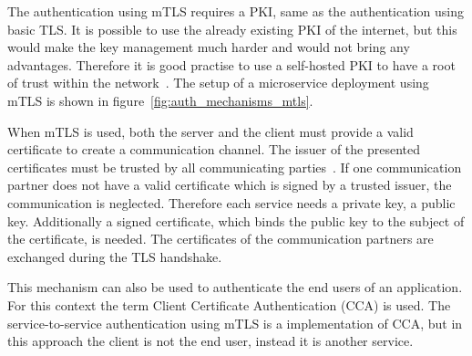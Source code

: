 The authentication using mTLS requires a PKI, same as the authentication using basic TLS.
It is possible to use the already existing PKI of the internet, but this would make the key management much harder and would not bring any advantages.
Therefore it is good practise to use a self-hosted PKI to have a root of trust within the network~\cite{dias2020microservices}.
The setup of a microservice deployment using mTLS is shown in figure~\ref{fig:auth_mechanisms_mtls}.

When mTLS is used, both the server and the client must provide a valid certificate to create a communication channel.
The issuer of the presented certificates must be trusted by all communicating parties~\cite{dias2020microservices}.
If one communication partner does not have a valid certificate which is signed by a trusted issuer, the communication is neglected.
Therefore each service needs a private key, a public key.
Additionally a signed certificate, which binds the public key to the subject of the certificate, is needed.
The certificates of the communication partners are exchanged during the TLS handshake.

This mechanism can also be used to authenticate the end users of an application.
For this context the term Client Certificate Authentication (CCA) is used.
The service-to-service authentication using mTLS is a implementation of CCA, but in this approach the client is not the end user, instead it is another service.

